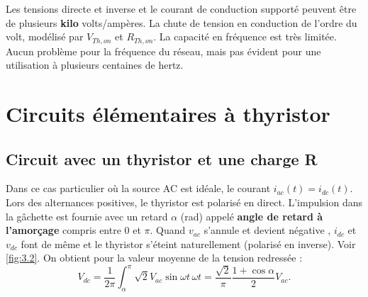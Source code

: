 		Les tensions directe et inverse et le courant de conduction supporté peuvent être de plusieurs \textbf{kilo} volts/ampères. La chute de tension en conduction de l'ordre du volt, modélisé par $V_{Th,on}$ et $R_{Th,on}$. La capacité en fréquence est très limitée. Aucun problème pour la fréquence du réseau, mais pas évident pour une utilisation à plusieurs centaines de hertz. 


	\section{Circuits élémentaires à thyristor}
		\subsection{Circuit avec un thyristor et une charge R}
			Dans ce cas particulier où la source AC est idéale, le courant $i_{ac}(t) = i_{dc}(t)$. Lors des alternances positives, le thyristor est polarisé en direct. L'impulsion dans la gâchette est fournie avec un retard $\alpha$ (rad) appelé \textbf{angle de retard à l'amorçage} compris entre 0 et $\pi$. Quand $v_{ac}$ s'annule et devient négative , $i_{dc}$ et $v_{dc}$ font de même et le thyristor s'éteint naturellement (polarisé en inverse). Voir \autoref{fig:3.2}. On obtient pour la valeur moyenne de la tension redressée :
			\begin{equation}
				V_{dc} = \frac{1}{2\pi}\int _\alpha ^\pi \sqrt{2} V_{ac} \sin \omega t \, \omega t = \frac{\sqrt{2}}{\pi} \frac{1+\cos \alpha}{2} V_{ac}.
			\end{equation}
			
